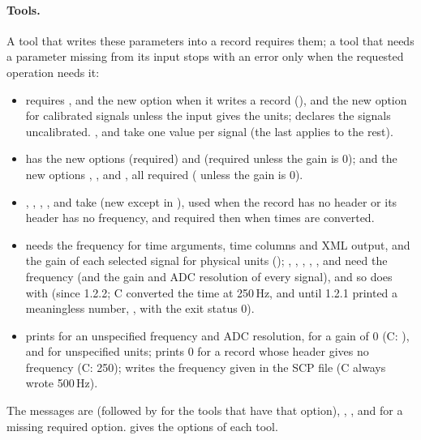 \paragraph{Tools.} A tool that writes these parameters into a record
requires them; a tool that needs a parameter missing from its input stops
with an error only when the requested operation needs it:
\begin{itemize}
\item {} requires ,  and the new option
   when it writes a record (), and the new option
   for calibrated signals unless the input gives the units;
   declares the signals uncalibrated. ,  and
   take one value per signal (the last applies to the rest).
\item {} has the new options  (required) and
   (required unless the gain is 0);  and
   the new options , ,
   and , all required ( unless the gain
  is 0).
\item {}, , , ,  and
   take  (new except in ), used when the
  record has no header or its header has no frequency, and required then
  when times are converted.
\item {} needs the frequency for time arguments, time columns and
  XML output, and the gain of each selected signal for physical units
  (); , , , ,
  ,  and  need the frequency (and
   the gain and ADC resolution of every signal), and so does
   with  (since 1.2.2; C converted the time at
  250\,Hz, and \wfdbx{} until 1.2.1 printed a meaningless number,
  , with the exit status 0).
\item {} prints  for an unspecified
  frequency and ADC resolution,  for a gain of 0 (C:
  ), and  for unspecified units;
   prints 0 for a record whose header gives no frequency (C:
  250);  writes the frequency given in the SCP file (C always
  wrote 500\,Hz).
\end{itemize}
The messages are  (followed by  for the tools that have that
option), ,
,
and  for a missing required
option.  gives the options of each tool.


